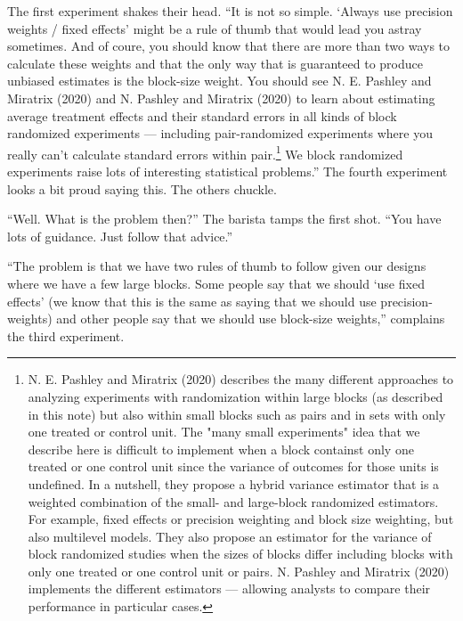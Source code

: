 \documentclass[
]{article}
\begin{document}
The first experiment shakes their head. ``It is not so simple. `Always use precision weights / fixed effects' might be a rule of thumb that would lead you astray sometimes. And of coure, you should know that there are more than two ways to calculate
these weights and that the only way that is guaranteed to produce unbiased
estimates is the block-size weight. You should see N. E. Pashley and Miratrix (2020) and
N. Pashley and Miratrix (2020) to learn about estimating average treatment effects and
their standard errors in all kinds of block randomized experiments ---
including pair-randomized experiments where you really can't calculate standard
errors within pair.\footnote{N. E. Pashley and Miratrix (2020) describes the many different
  approaches to analyzing experiments with randomization within large blocks (as
  described in this note) but also within small blocks such as pairs and in sets
  with only one treated or control unit. The "many small experiments" idea that
  we describe here is difficult to implement when a block containst only one
  treated or one control unit since the variance of outcomes for those units is
  undefined. In a nutshell, they propose a hybrid variance estimator that is a
  weighted combination of the small- and large-block randomized estimators. For
  example, fixed effects or precision weighting and block size weighting, but
  also multilevel models. They also propose an estimator for the variance of
  block randomized studies when the sizes of blocks differ including blocks with
  only one treated or one control unit or pairs. N. Pashley and Miratrix (2020) implements
  the different estimators --- allowing analysts to compare their performance in
  particular cases.} We block randomized experiments raise lots of interesting
statistical problems.'' The fourth experiment looks a bit proud saying this. The
others chuckle.

``Well. What is the problem then?'' The barista tamps the first shot. ``You have
lots of guidance. Just follow that advice.''

``The problem is that we have two rules of thumb to follow given our designs
where we have a few large blocks. Some people say that we should `use fixed
effects' (we know that this is the same as saying that we should use
precision-weights) and other people say that we should use block-size weights,''
complains the third experiment.
\end{document}
